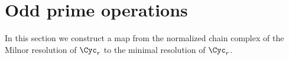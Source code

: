 
\section{Odd prime operations}

In this section we construct a map from the normalized chain complex  of the Milnor resolution of $\Cyc_r$ to the minimal resolution of $\Cyc_r$.





